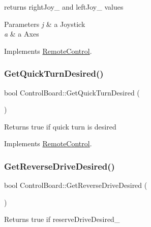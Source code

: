 returns right\+Joy\+\_\+ and left\+Joy\+\_\+ values 
\begin{DoxyParams}{Parameters}
{\em j} & a Joystick \\
\hline
{\em a} & a Axes \\
\hline
\end{DoxyParams}


Implements \hyperlink{class_remote_control}{Remote\+Control}.

\mbox{\label{class_control_board_ac43151ba49812cc42028c957506a4cc4}} 
\subsubsection{\texorpdfstring{Get\+Quick\+Turn\+Desired()}{GetQuickTurnDesired()}}
{\footnotesize\ttfamily bool Control\+Board\+::\+Get\+Quick\+Turn\+Desired (\begin{DoxyParamCaption}{ }\end{DoxyParamCaption})\hspace{0.3cm}{\ttfamily [virtual]}}

\begin{DoxyReturn}{Returns}
true if quick turn is desired 
\end{DoxyReturn}


Implements \hyperlink{class_remote_control}{Remote\+Control}.

\mbox{\label{class_control_board_a53f6a067fdec6785017465dba9ee2be6}} 
\subsubsection{\texorpdfstring{Get\+Reverse\+Drive\+Desired()}{GetReverseDriveDesired()}}
{\footnotesize\ttfamily bool Control\+Board\+::\+Get\+Reverse\+Drive\+Desired (\begin{DoxyParamCaption}{ }\end{DoxyParamCaption})\hspace{0.3cm}{\ttfamily [virtual]}}

\begin{DoxyReturn}{Returns}
true if reserve\+Drive\+Desired\+\_\+ 
\end{DoxyReturn}


